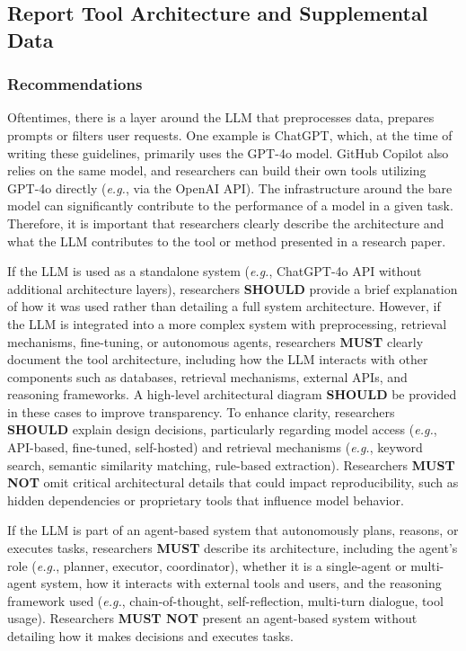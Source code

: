 \documentclass[11pt]{article}
\newcommand{\must}{\textbf{MUST}\xspace}
\newcommand{\mustnot}{\textbf{MUST NOT}\xspace}
\newcommand{\should}{\textbf{SHOULD}\xspace}
\begin{document}
\subsection{Report Tool Architecture and Supplemental Data}

\subsubsection{Recommendations}

Oftentimes, there is a layer around the LLM that preprocesses data, prepares prompts or filters user requests. One example is ChatGPT, which, at the time of writing these guidelines, primarily uses the GPT-4o model. GitHub Copilot also relies on the same model, and researchers can build their own tools utilizing GPT-4o directly (\textit{e.g.}, via the OpenAI API). The infrastructure around the bare model can significantly contribute to the performance of a model in a given task.
Therefore, it is important that researchers clearly describe the architecture and what the LLM contributes to the tool or method presented in a research paper.


If the LLM is used as a standalone system (\textit{e.g.}, ChatGPT-4o API without additional architecture layers), researchers \should provide a brief explanation of how it was used rather than detailing a full system architecture. However, if the LLM is integrated into a more complex system with preprocessing, retrieval mechanisms, fine-tuning, or autonomous agents, researchers \must clearly document the tool architecture, including how the LLM interacts with other components such as databases, retrieval mechanisms, external APIs, and reasoning frameworks. A high-level architectural diagram \should be provided in these cases to improve transparency. To enhance clarity, researchers \should explain design decisions, particularly regarding model access (\textit{e.g.}, API-based, fine-tuned, self-hosted) and retrieval mechanisms (\textit{e.g.}, keyword search, semantic similarity matching, rule-based extraction). Researchers \mustnot omit critical architectural details that could impact reproducibility, such as hidden dependencies or proprietary tools that influence model behavior.


If the LLM is part of an agent-based system that autonomously plans, reasons, or executes tasks, researchers \must describe its architecture, including the agent's role (\textit{e.g.}, planner, executor, coordinator), whether it is a single-agent or multi-agent system, how it interacts with external tools and users, and the reasoning framework used (\textit{e.g.}, chain-of-thought, self-reflection, multi-turn dialogue, tool usage). Researchers \mustnot present an agent-based system without detailing how it makes decisions and executes tasks.
\end{document}
